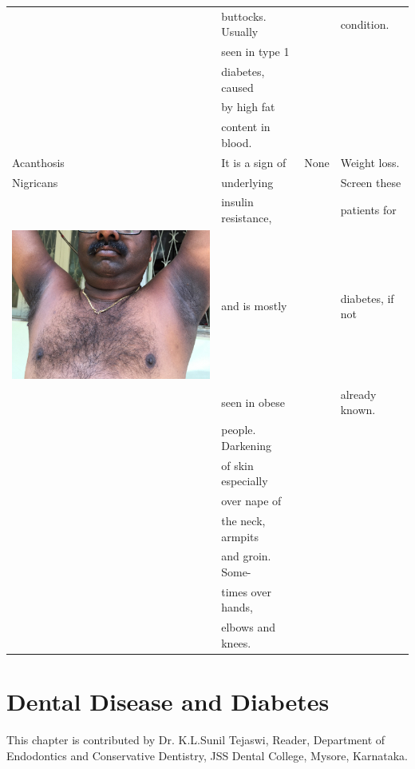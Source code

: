 {\begin{longtable}{|l|l|l|l|}
 & buttocks. Usually &  & condition.\\
 & seen in type 1 &  & \\
 & diabetes, caused &  & \\
 & by high fat &  & \\
 & content in blood. &  & \\
\hline
Acanthosis & It is a sign of & None & Weight loss.\\
Nigricans & underlying &  & Screen these\\
 & insulin resistance, &  & patients for\\
\includegraphics{images/072a.jpg} & and is mostly &  & diabetes, if not\\
 & seen in obese &  & already known.\\
 & people. Darkening &  & \\
 & of skin especially &  & \\
 & over nape of &  & \\
 & the neck, armpits &  & \\
 & and groin. Some- &  & \\
 & times over hands, &  & \\
 & elbows and knees. &  & \\
\hline
\end{longtable}
}\relax


\newpage
 
\setcounter{chapter}{17}
\renewcommand{\thechapter}{\arabic{chapter}B}
\chapter{Dental Disease and Diabetes}\label{chap18B}

This chapter is contributed by Dr. K.L.Sunil Tejaswi, Reader, Department of Endodontics and Conservative Dentistry, JSS Dental College, Mysore, Karnataka.

